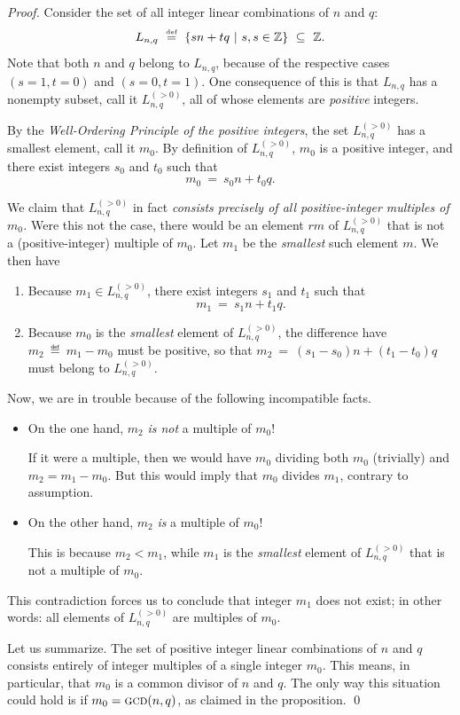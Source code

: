 \begin{proof}
Consider the set of all integer linear combinations of $n$ and $q$:
\[  L_{n,q} \ \stackrel{\mbox{{\tiny def}}}{=} \   \{ sn +tq \ | \ s, s \in \mathbb{Z} \} \ \subseteq \ \mathbb{Z}. \]
Note that both $n$ and $q$ belong to $L_{n,q}$, because of the
respective cases $(s=1, t=0)$ and $(s=0, t=1)$.  One consequence of
this is that $L_{n,q}$ has a nonempty subset, call it
$L^{(>0)}_{n,q}$, all of whose elements are {\em positive} integers.

By the {\it Well-Ordering Principle of the positive integers}, the set
$L^{(>0)}_{n,q}$ has a smallest element, call it $m_0$.  By definition
of $L^{(>0)}_{n,q}$, $m_0$ is a positive integer, and there exist
integers $s_0$ and $t_0$ such that
\[  m_0 \ = \ s_0 n + t_0 q. \]

We claim that $L^{(>0)}_{n,q}$ in fact {\em consists precisely of all
  positive-integer multiples of $m_0$.}  Were this not the case, there
would be an element $rm$ of $L^{(>0)}_{n,q}$ that is not a
(positive-integer) multiple of $m_0$.  Let $m_1$ be the {\em smallest}
such element $m$.  We then have
\begin{enumerate}
\item
Because $m_1 \in L^{(>0)}_{n,q}$, there exist integers $s_1$ and $t_1$
such that
\[  m_1 \ = \ s_1 n + t_1 q. \]
\item
Because $m_0$ is the {\em smallest} element of $L^{(>0)}_{n,q}$, the
difference have $m_2 \ \eqdef \ m_1 - m_0$ must be positive, so that
$m_2 \ = \ (s_1 - s_0) n + (t_1 -t_0) q$ must belong to
$L^{(>0)}_{n,q}$.
\end{enumerate}
Now, we are in trouble because of the following incompatible facts.
\begin{itemize}
\item
On the one hand, $m_2$ {\em is not} a multiple of $m_0$!

If it were a multiple, then we would have $m_0$ dividing both $m_0$
(trivially) and $m_2 = m_1 - m_0$.  But this would imply that $m_0$
divides $m_1$, contrary to assumption.

\item
On the other hand,
$m_2$ {\em is} a multiple of $m_0$!

This is because $m_2 < m_1$, while $m_1$ is the {\em smallest} element
of $L^{(>0)}_{n,q}$ that is not a multiple of $m_0$.
\end{itemize}
This contradiction forces us to conclude that integer $m_1$ does not
exist; in other words: all elements of $L^{(>0)}_{n,q}$ are multiples
of $m_0$.

Let us summarize.  The set of positive integer linear combinations of
$n$ and $q$ consists entirely of integer multiples of a single integer
$m_0$.  This means, in particular, that $m_0$ is a common divisor
of $n$ and $q$.  The only way this situation could hold is if
$m_0 = \mbox{\sc gcd}(n,q)$, as claimed in the proposition.  \qed
\end{proof}

